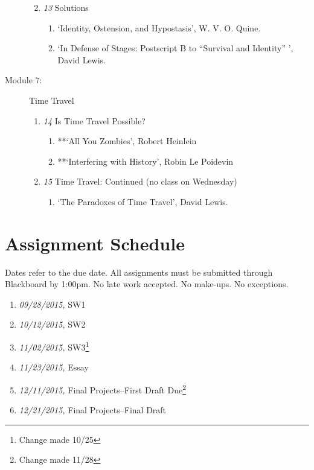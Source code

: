\documentclass[article,oneside]{memoir}
\begin{document}
\begin{description}
\begin{enumerate}
\item \textit{13} Solutions
\begin{enumerate}
 \item `Identity, Ostension, and Hypostasis', W. V. O. Quine.
\item `In Defense of Stages: Postscript B to ``Survival and Identity'' ', David Lewis.
\end{enumerate}
\end{enumerate}

\item[Module 7:] Time Travel
\begin{enumerate}
\item \textit{14} Is Time Travel Possible?
\begin{enumerate}
\item **`All You Zombies', Robert Heinlein 
\item **`Interfering with History', Robin Le Poidevin 
\end{enumerate}
\item \textit{15} Time Travel: Continued (no class on Wednesday)
\begin{enumerate}
\item `The Paradoxes of Time Travel', David Lewis.
\end{enumerate}
\end{enumerate}
\end{description}

\section{ Assignment Schedule}
Dates refer to the due date. All assignments must be submitted through Blackboard by 1:00pm. No late work accepted. No make-ups. No exceptions. 

\begin{enumerate}
\item \textit{09/28/2015,} SW1
\item \textit{10/12/2015,} SW2
\item \textit{11/02/2015,} SW3\footnote{Change made 10/25}
\item \textit{11/23/2015,} Essay 
\item \textit{12/11/2015,} Final Projects--First Draft Due\footnote{Change made 11/28}
\item \textit{12/21/2015,} Final Projects--Final Draft
\end{enumerate}




\end{document}
